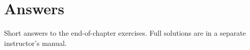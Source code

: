 \chapter{Answers}
\label{sec:answers}

Short answers to the end-of-chapter exercises. Full solutions are in a separate instructor's manual.























